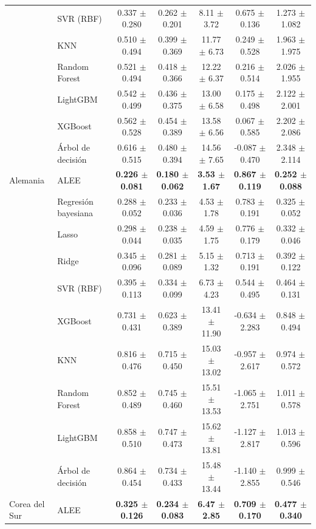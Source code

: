 \begin{longtable}{llccccc}
 & SVR (RBF) & 0.337 $\pm$ 0.280 & 0.262 $\pm$ 0.201 & 8.11 $\pm$ 3.72 & 0.675 $\pm$ 0.136 & 1.273 $\pm$ 1.082 \\
 & KNN & 0.510 $\pm$ 0.494 & 0.399 $\pm$ 0.369 & 11.77 $\pm$ 6.73 & 0.249 $\pm$ 0.528 & 1.963 $\pm$ 1.975 \\
 & Random Forest & 0.521 $\pm$ 0.494 & 0.418 $\pm$ 0.366 & 12.22 $\pm$ 6.37 & 0.216 $\pm$ 0.514 & 2.026 $\pm$ 1.955 \\
 & LightGBM & 0.542 $\pm$ 0.499 & 0.436 $\pm$ 0.375 & 13.00 $\pm$ 6.58 & 0.175 $\pm$ 0.498 & 2.122 $\pm$ 2.001 \\
 & XGBoost & 0.562 $\pm$ 0.528 & 0.454 $\pm$ 0.389 & 13.58 $\pm$ 6.56 & 0.067 $\pm$ 0.585 & 2.202 $\pm$ 2.086 \\
 & Árbol de decisión & 0.616 $\pm$ 0.515 & 0.480 $\pm$ 0.394 & 14.56 $\pm$ 7.65 & -0.087 $\pm$ 0.470 & 2.348 $\pm$ 2.114 \\
\midrule
Alemania & ALEE & \textbf{0.226 $\pm$ 0.081} & \textbf{0.180 $\pm$ 0.062} & \textbf{3.53 $\pm$ 1.67} & \textbf{0.867 $\pm$ 0.119} & \textbf{0.252 $\pm$ 0.088} \\
 & Regresión bayesiana & 0.288 $\pm$ 0.052 & 0.233 $\pm$ 0.036 & 4.53 $\pm$ 1.78 & 0.783 $\pm$ 0.191 & 0.325 $\pm$ 0.052 \\
 & Lasso & 0.298 $\pm$ 0.044 & 0.238 $\pm$ 0.035 & 4.59 $\pm$ 1.75 & 0.776 $\pm$ 0.179 & 0.332 $\pm$ 0.046 \\
 & Ridge & 0.345 $\pm$ 0.096 & 0.281 $\pm$ 0.089 & 5.15 $\pm$ 1.32 & 0.713 $\pm$ 0.191 & 0.392 $\pm$ 0.122 \\
 & SVR (RBF) & 0.395 $\pm$ 0.113 & 0.334 $\pm$ 0.099 & 6.73 $\pm$ 4.23 & 0.544 $\pm$ 0.495 & 0.464 $\pm$ 0.131 \\
 & XGBoost & 0.731 $\pm$ 0.431 & 0.623 $\pm$ 0.389 & 13.41 $\pm$ 11.90 & -0.634 $\pm$ 2.283 & 0.848 $\pm$ 0.494 \\
 & KNN & 0.816 $\pm$ 0.476 & 0.715 $\pm$ 0.450 & 15.03 $\pm$ 13.02 & -0.957 $\pm$ 2.617 & 0.974 $\pm$ 0.572 \\
 & Random Forest & 0.852 $\pm$ 0.489 & 0.745 $\pm$ 0.460 & 15.51 $\pm$ 13.53 & -1.065 $\pm$ 2.751 & 1.011 $\pm$ 0.578 \\
 & LightGBM & 0.858 $\pm$ 0.510 & 0.747 $\pm$ 0.473 & 15.62 $\pm$ 13.81 & -1.127 $\pm$ 2.817 & 1.013 $\pm$ 0.596 \\
 & Árbol de decisión & 0.864 $\pm$ 0.454 & 0.734 $\pm$ 0.433 & 15.48 $\pm$ 13.44 & -1.140 $\pm$ 2.855 & 0.999 $\pm$ 0.546 \\
\midrule
Corea del Sur & ALEE & \textbf{0.325 $\pm$ 0.126} & \textbf{0.234 $\pm$ 0.083} & \textbf{6.47 $\pm$ 2.85} & \textbf{0.709 $\pm$ 0.170} & \textbf{0.477 $\pm$ 0.340} \\

\end{longtable}
